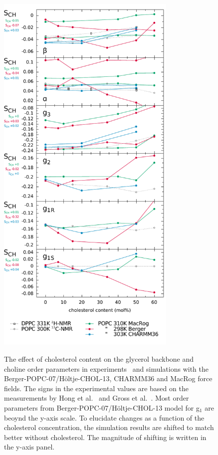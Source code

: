 \documentclass[journal=jacsat,manuscript=article]{achemso}
\begin{document}
\begin{figure}[]
  \centering
  \includegraphics[width=8.6cm]{../DATAreportediINblog/cholesterolization.pdf}
   \\
  \caption{\label{ordPchol}
    The effect of cholesterol content on the glycerol backbone and choline order parameters in experiments~\cite{brown78,ferreira13} and simulations
    with the Berger-POPC-07/H\"oltje-CHOL-13, CHARMM36 and MacRog force fields. The signs in the experimental values are based on the measurements by Hong et al.~\cite{hong95a,hong95b} 
    and Gross et al.~\cite{gross97}.  Most order parameters from Berger-POPC-07/H\"oltje-CHOL-13 model for g$_1$ are beoynd the y-axis scale.
    To elucidate changes as a function of the cholesterol concentration, the 
    simulation results are shifted to match better without cholesterol.   
    The magnitude of shifting is written in the y-axis panel.
}
\end{figure}
\end{document}
